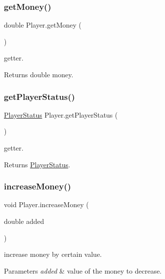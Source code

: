\subsubsection{\texorpdfstring{get\+Money()}{getMoney()}}
{\footnotesize\ttfamily double Player.\+get\+Money (\begin{DoxyParamCaption}{ }\end{DoxyParamCaption})\hspace{0.3cm}{\ttfamily [inline]}}

getter. \begin{DoxyReturn}{Returns}
double money. 
\end{DoxyReturn}
\mbox{\label{class_player_a0c7b0dad54f27eeccf3bb8e1bd4779c9}} 
\subsubsection{\texorpdfstring{get\+Player\+Status()}{getPlayerStatus()}}
{\footnotesize\ttfamily \mbox{\hyperlink{enum_player_1_1_player_status}{Player\+Status}} Player.\+get\+Player\+Status (\begin{DoxyParamCaption}{ }\end{DoxyParamCaption})\hspace{0.3cm}{\ttfamily [inline]}}

getter. \begin{DoxyReturn}{Returns}
\mbox{\hyperlink{enum_player_1_1_player_status}{Player\+Status}}. 
\end{DoxyReturn}
\mbox{\label{class_player_a09d885315c59a404c418155e04fed379}} 
\subsubsection{\texorpdfstring{increase\+Money()}{increaseMoney()}}
{\footnotesize\ttfamily void Player.\+increase\+Money (\begin{DoxyParamCaption}\item[{double}]{added }\end{DoxyParamCaption})\hspace{0.3cm}{\ttfamily [inline]}}

increase money by certain value. 
\begin{DoxyParams}{Parameters}
{\em added} & value of the money to decrease. \\
\hline
\end{DoxyParams}
\mbox{\label{class_player_a612fdd92f5c71a5dd8c3cd9ead192546}} 
